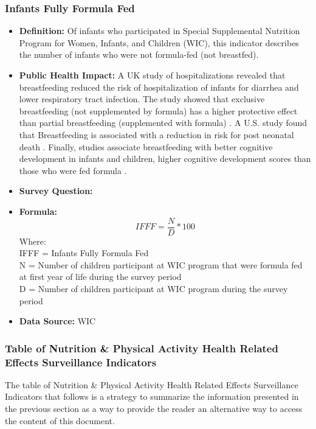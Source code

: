 \documentclass[12pt,letterpaper]{report}
\begin{document}
\subsubsection{Infants Fully Formula Fed}
\begin{itemize}
		\item \textbf{Definition:} Of infants who participated in Special Supplemental Nutrition Program for Women, Infants, and Children (WIC), this indicator describes the number of infants who were not formula-fed (not breastfed).
		\item \textbf{Public Health Impact:} A UK study of hospitalizations revealed that breastfeeding reduced the risk of hospitalization of infants for diarrhea and lower respiratory tract infection. The study showed that exclusive breastfeeding (not supplemented by formula) has a higher protective effect than partial breastfeeding (supplemented with formula) \cite{quigley2007breastfeeding}. A U.S. study found that Breastfeeding is associated with a reduction in risk for post neonatal death \cite{chen2004breastfeeding}. Finally, studies associate breastfeeding with better cognitive development in infants and children, higher cognitive development scores than those who were fed formula \cite{anderson1999breast}. 
		\item \textbf{Survey Question:}
		\item \textbf{Formula:} 
			\begin{equation}
				IFFF = \frac{N}{D} *100
			\end{equation}
Where: \\
			IFFF = Infants Fully Formula Fed \\
			
			N = Number of children participant at WIC program that were formula fed at first year of life during the survey period \\
			
			D = Number of children participant at WIC program during the survey period \\
			
		\item \textbf{Data Source:} WIC
	\end{itemize}


\subsubsection{Table of Nutrition \& Physical Activity Health Related Effects Surveillance Indicators}
	
The table of Nutrition \& Physical Activity Health Related Effects Surveillance Indicators that follows is a strategy to summarize the information presented in the previous section as a way to provide the reader an alternative way to access the content of this document.
\end{document}
